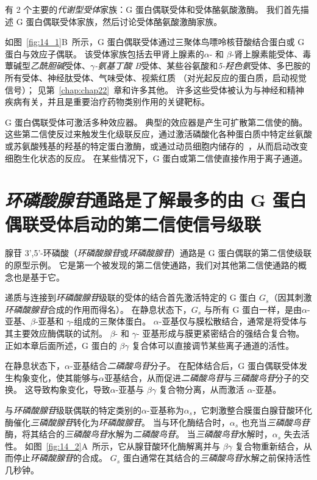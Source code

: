有 2 个主要的\textit{代谢型受体}家族：G 蛋白偶联受体和受体酪氨酸激酶。
我们首先描述 G 蛋白偶联受体家族，然后讨论受体酪氨酸激酶家族。


如图~\ref{fig:14_1}B~所示，G 蛋白偶联受体通过三聚体鸟嘌呤核苷酸结合蛋白或 G 蛋白与效应子偶联。
该受体家族包括去甲肾上腺素的$\alpha$- 和 $\beta$-肾上腺素能受体、毒蕈碱型\textit{乙酰胆碱}受体、\textit{$\gamma$-氨基丁酸 B}受体、某些谷氨酸和\textit{5-羟色氨}受体、多巴胺的所有受体、神经肽受体、气味受体、视紫红质 （对光起反应的蛋白质，启动视觉信号）；
见第~\ref{chap:chap22}~章和许多其他。
许多这些受体被认为与神经和精神疾病有关，并且是重要治疗药物类别作用的关键靶标。


G 蛋白偶联受体可激活多种效应器。
典型的效应器是产生可扩散第二信使的酶。
这些第二信使反过来触发生化级联反应，通过激活磷酸化各种蛋白质中特定丝氨酸或苏氨酸残基的羟基的特定蛋白激酶，或通过动员细胞内储存的~，从而启动改变细胞生化状态的反应。
在某些情况下，G 蛋白或第二信使直接作用于离子通道。



\section{\textit{环磷酸腺苷}通路是了解最多的由 G 蛋白偶联受体启动的第二信使信号级联}

腺苷 3',5'-环磷酸（\textit{环磷酸腺苷}或\textit{环磷酸腺苷}）通路是 G 蛋白偶联的第二信使级联的原型示例。
它是第一个被发现的第二信使通路，我们对其他第二信使通路的概念也是基于它。


递质与连接到\textit{环磷酸腺苷}级联的受体的结合首先激活特定的 G 蛋白 $ G_s $（因其刺激\textit{环磷酸腺苷}合成的作用而得名）。
在静息状态下，$ G_s $ 与所有 G 蛋白一样，是由$\alpha$-亚基、$\beta$-亚基和 $\gamma$-组成的三聚体蛋白。
$\alpha$-亚基仅与膜松散结合，通常是将受体与其主要效应酶偶联的试剂。
$\beta$- 和 $\gamma$- 亚基形成与膜更紧密结合的强结合复合物。
正如本章后面所述，G 蛋白的 $\beta \gamma$ 复合体可以直接调节某些离子通道的活性。


在静息状态下，$\alpha$-亚基结合\textit{二磷酸鸟苷}分子。
在配体结合后，G 蛋白偶联受体发生构象变化，使其能够与$\alpha$亚基结合，从而促进\textit{二磷酸鸟苷}与\textit{三磷酸鸟苷}分子的交换。
这导致构象变化，导致$\alpha$-亚基与 $\beta \gamma$ 复合物分离，从而激活 $\alpha$-亚基。


与\textit{环磷酸腺苷}级联偶联的特定类别的$\alpha$-亚基称为$\alpha_s$，它刺激整合膜蛋白腺苷酸环化酶催化\textit{三磷酸腺苷}转化为\textit{环磷酸腺苷}。
当与环化酶结合时，$\alpha_s$ 也充当\textit{三磷酸鸟苷}酶，将其结合的\textit{三磷酸鸟苷}水解为\textit{二磷酸鸟苷}。
当\textit{三磷酸鸟苷}水解时，$\alpha_s$ 失去活性。
如图~\ref{fig:14_2}A~所示，它从腺苷酸环化酶解离并与 $\beta \gamma$ 复合物重新结合，从而停止\textit{环磷酸腺苷}的合成。
$ G_s $ 蛋白通常在其结合的\textit{三磷酸鸟苷}水解之前保持活性几秒钟。


